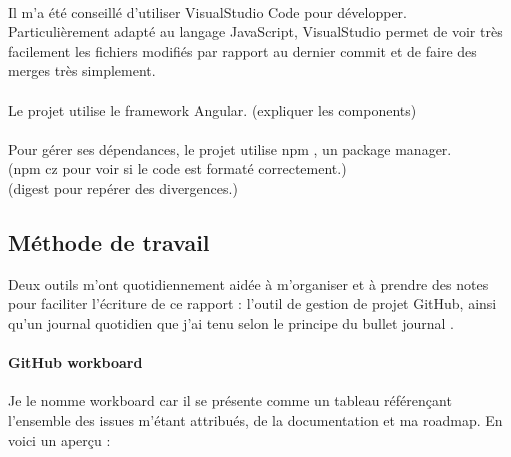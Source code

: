 \documentclass[12pt]{article}
\begin{document}
\paragraph{}
Il m'a été conseillé d'utiliser VisualStudio Code pour développer. Particulièrement adapté au langage JavaScript, VisualStudio permet de voir très facilement les fichiers modifiés par rapport au dernier commit et de faire des merges très simplement.

\paragraph{}
Le projet utilise le framework Angular. (expliquer les components)

\paragraph{}
Pour gérer ses dépendances, le projet utilise npm \cite{npm}, un package manager.\\

(npm cz pour voir si le code est formaté correctement.)\\

(digest pour repérer des divergences.)\\

\subsection{Méthode de travail}
Deux outils m'ont quotidiennement aidée à m'organiser et à prendre des notes pour faciliter l'écriture de ce rapport : l'outil de gestion de projet GitHub, ainsi qu'un journal quotidien que j'ai tenu selon le principe du bullet journal \cite{bullet}.

\paragraph{GitHub workboard}
Je le nomme workboard car il se présente comme un tableau référençant l'ensemble des issues m'étant attribués, de la documentation et ma roadmap. En voici un aperçu :
\end{document}
